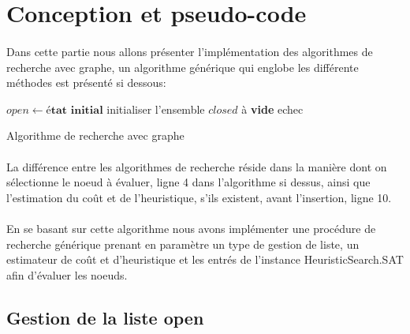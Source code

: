 \section{Conception et pseudo-code}
\paragraph{}
Dans cette partie nous allons présenter l’implémentation des algorithmes de recherche avec graphe, un algorithme générique qui englobe les différente méthodes est présenté si dessous:

\begin{algorithm}
	\SetAlgoLined
	$open \gets \textbf{état initial}$\;
	initialiser l'ensemble $closed$ à \textbf{vide}\;
	\Return echec\;
\caption{Algorithme de recherche avec graphe}
\end{algorithm}
\paragraph{}
La différence entre les algorithmes de recherche réside dans la manière dont on sélectionne le noeud à évaluer, ligne 4 dans l’algorithme si dessus, ainsi que l’estimation du coût et de l’heuristique, s’ils existent, avant l’insertion, ligne 10.\\
\paragraph{}
En se basant sur cette algorithme nous avons implémenter une procédure de recherche générique prenant en paramètre un type de gestion de liste, un estimateur de coût et d’heuristique et les entrés de l’instance HeuristicSearch.SAT afin d’évaluer les noeuds.
\subsection{Gestion de la liste open}
\paragraph{}

